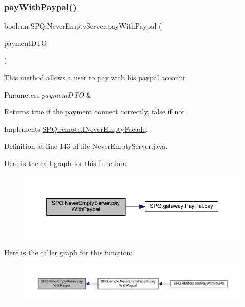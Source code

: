\subsubsection{\texorpdfstring{pay\+With\+Paypal()}{payWithPaypal()}}
{\footnotesize\ttfamily boolean S\+P\+Q.\+Never\+Empty\+Server.\+pay\+With\+Paypal (\begin{DoxyParamCaption}\item[{\mbox{\hyperlink{class_s_p_q_1_1dto_1_1_payment_d_t_o}{Payment\+D\+TO}}}]{payment\+D\+TO }\end{DoxyParamCaption})}

This method allows a user to pay with his paypal account 
\begin{DoxyParams}{Parameters}
{\em payment\+D\+TO} & \\
\hline
\end{DoxyParams}
\begin{DoxyReturn}{Returns}
true if the payment connect correctly, false if not 
\end{DoxyReturn}


Implements \mbox{\hyperlink{interface_s_p_q_1_1remote_1_1_i_never_empty_facade_a2d34c64f91537d8c7138094e418de785}{S\+P\+Q.\+remote.\+I\+Never\+Empty\+Facade}}.



Definition at line 143 of file Never\+Empty\+Server.\+java.

Here is the call graph for this function\+:\nopagebreak
\begin{figure}[H]
\begin{center}
\leavevmode
\includegraphics[width=350pt]{class_s_p_q_1_1_never_empty_server_a954ea8c563055eae79564b357e557f85_cgraph}
\end{center}
\end{figure}
Here is the caller graph for this function\+:\nopagebreak
\begin{figure}[H]
\begin{center}
\leavevmode
\includegraphics[width=350pt]{class_s_p_q_1_1_never_empty_server_a954ea8c563055eae79564b357e557f85_icgraph}
\end{center}
\end{figure}
\mbox{\label{class_s_p_q_1_1_never_empty_server_a455fa773e66917007842f9a92243ffa8}} 
